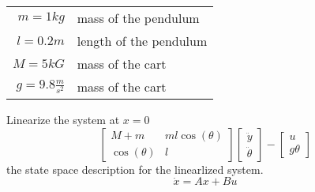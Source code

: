 {  \begin{tabular}{r|l}
    $m=1kg$ & mass of the pendulum\\
    $l=0.2m$ & length of the pendulum\\
    $M = 5kG$ & mass of the cart\\
    $g = 9.8\frac m {s^2}$ & mass of the cart
  \end{tabular}
  
  Linearize the system at $x=0$
  \begin{equation}
    \begin{bmatrix}
      M+m & ml\cos(\theta) \\
      \cos(\theta) & l
    \end{bmatrix}
    \begin{bmatrix}
      \ddot y\\
      \ddot \theta
    \end{bmatrix} -
    \begin{bmatrix}
      u \\
      g\theta
    \end{bmatrix}
  \end{equation}
  the state space description for the linearlized system.
  \begin{equation}
    \dot x = Ax + Bu
  \end{equation}

}
